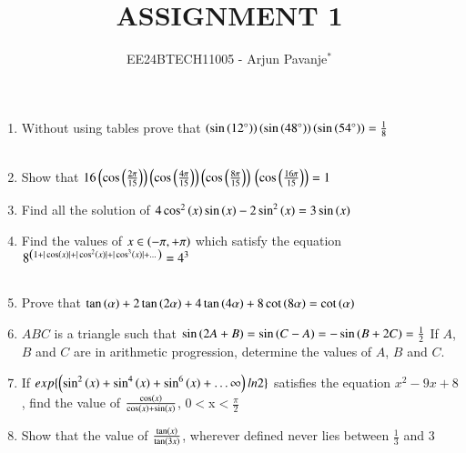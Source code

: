 \documentclass[journal,12pt,article,twocolumn]{IEEEtran}
\theoremstyle{remark}
\begin{document}

\vspace{3cm}

\title{ASSIGNMENT 1}
\author{EE24BTECH11005 - Arjun Pavanje$^{*}$%
}
\maketitle
\newpage
\bigskip
\begin{enumerate}
\item Without using tables prove that $\brak{\sin\brak{12^{\circ}}}\brak{\sin\brak{48^{\circ}}}\brak{\sin\brak{54^{\circ}}}= \frac{1}{8}$\\
\hfill {}\\
\item Show that $16\brak{\cos\brak{\frac{2\pi}{15}}}\brak{\cos\brak{\frac{4\pi}{15}}}\brak{\cos\brak{\frac{8\pi}{15}}}\\\brak{\cos\brak{\frac{16\pi}{15}}}=1$ \hfill{}\\
\item Find all the solution of $4\cos^2\brak{x} \sin \brak{x} -2\sin^2\brak{x} = 3\sin \brak{x}$
\hfill{}\\
\item Find the values of $x \in \brak{-\pi, +\pi}$ which satisfy the equation
$8^{\brak{1+|\cos \brak{x}|+|\cos^2\brak{x}|+|\cos^3\brak{x}|+\dots}}= 4^3$\\
\hfill{}\\
\item Prove that $\tan \brak{\alpha}+2\tan \brak{2\alpha}+4\tan \brak{4\alpha}+8\cot \brak{8\alpha}=\cot \brak{\alpha}$
\hfill{}\\
\item $ABC$ is a triangle such that $\sin{\brak{2A+B}}=\sin{\brak{C-A}}=-\sin{\brak{B+2C}}=\frac{1}{2}$ If $A$, $B$ and $C$ are in arithmetic progression, determine the values of $A$, $B$ and $C$.
\hfill{}\\
\item If $exp \{\brak{\sin^2\brak{x}+\sin^4\brak{x}+\sin^6\brak{x}+\dots\infty}ln2\}$ satisfies the equation $x^2-9x+8$, find the value of $\frac{\cos \brak{x}}{\cos \brak{x} + \sin \brak{x}}$, 0$<$x$<$$\frac{\pi}{2}$
\hfill{}\\
\item Show that the value of  $\frac{\tan \brak{x}}{\tan \brak{3x}}$, wherever defined never lies between $\frac{1}{3}$ and 3
\hfill{}\\
$$
\end{enumerate}
\end{document}
